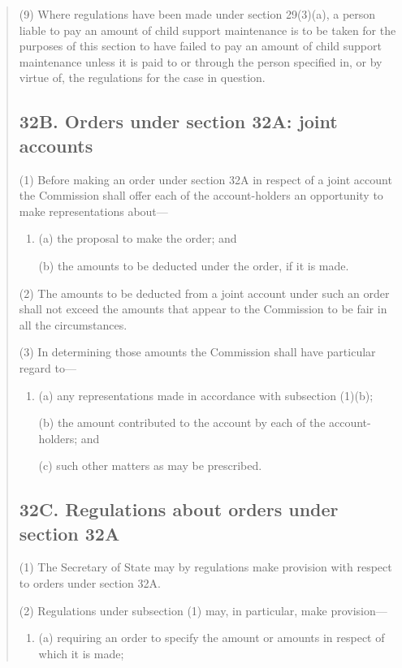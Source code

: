 \documentclass[a4paper]{article}
\begin{document}
\begin{quotation}
(9)
Where regulations have been made under section 29(3)(a), a person liable to pay an amount of child support maintenance is to be taken for the purposes of this section to have failed to pay an amount of child support maintenance unless it is paid to or through the person specified in, or by virtue of, the regulations for the case in question.

\subsection*{32B. Orders under section 32A: joint accounts}

(1) Before making an order under section 32A in respect of a joint account 
the Commission shall offer each of the account-holders an opportunity to make representations about---
\begin{enumerate}\item[]
(a) the proposal to make the order; and

(b) the amounts to be deducted under the order, if it is made.
\end{enumerate}

(2)
The amounts to be deducted from a joint account under such an order shall not exceed the amounts that appear to the Commission to be fair in all the circumstances.

(3)
In determining those amounts the Commission shall have particular regard to---
\begin{enumerate}\item[]
(a) any representations made in accordance with subsection (1)(b);

\begin{sloppypar}
(b) the amount contributed to the account by each of the account-holders; and
\end{sloppypar}

(c) such other matters as may be prescribed.
\end{enumerate}

\subsection*{32C. Regulations about orders under section 32A}

(1) The Secretary of State may by regulations make provision with respect
to orders under section 32A.

(2) Regulations under subsection (1) may, in particular, make provision---
\begin{enumerate}\item[]
(a) requiring an order to specify the amount or amounts in respect of which it is made;


\end{enumerate}
\end{quotation}
\end{document}
